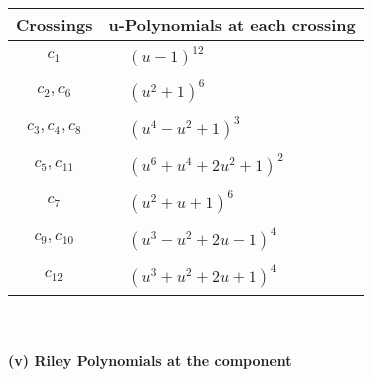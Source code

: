 \documentclass[1p]{elsarticle_modified}
\theoremstyle{definition}
\begin{document}
\begin{tabular}{m{50pt}|m{274pt}}
Crossings & \hspace{64pt}u-Polynomials at each crossing \\
\hline $$\begin{aligned}c_{1}\end{aligned}$$&$\begin{aligned}
&(u-1)^{12}
\end{aligned}$\\
\hline $$\begin{aligned}c_{2},c_{6}\end{aligned}$$&$\begin{aligned}
&(u^2+1)^6
\end{aligned}$\\
\hline $$\begin{aligned}c_{3},c_{4},c_{8}\end{aligned}$$&$\begin{aligned}
&(u^4- u^2+1)^3
\end{aligned}$\\
\hline $$\begin{aligned}c_{5},c_{11}\end{aligned}$$&$\begin{aligned}
&(u^6+u^4+2 u^2+1)^2
\end{aligned}$\\
\hline $$\begin{aligned}c_{7}\end{aligned}$$&$\begin{aligned}
&(u^2+u+1)^6
\end{aligned}$\\
\hline $$\begin{aligned}c_{9},c_{10}\end{aligned}$$&$\begin{aligned}
&(u^3- u^2+2 u-1)^4
\end{aligned}$\\
\hline $$\begin{aligned}c_{12}\end{aligned}$$&$\begin{aligned}
&(u^3+u^2+2 u+1)^4
\end{aligned}$\\
\hline
\end{tabular}\\~\\
\newpage\renewcommand{\arraystretch}{1}
\flushleft \textbf{(v) Riley Polynomials at the component}\newline \\
\end{document}
